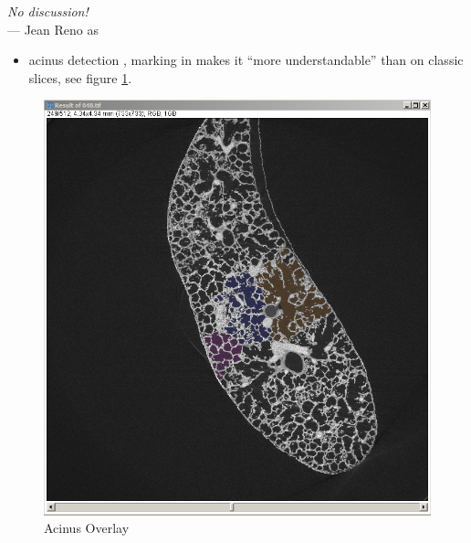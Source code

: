 \label{ch:discussion}
\begin{flushright}{\slshape No discussion!} \\ \medskip
    --- Jean Reno as \citep{Leon}
\end{flushright}
\bigskip
\begin{itemize}
	\item acinus detection \threed, marking in \twod makes it ``more understandable'' than on classic slices, see figure \ref{fig:acinus overlay}.
\end{itemize}
\vspace{52mm}

\renewcommand{\imsize}{0.618\linewidth}

\begin{figure}[h]
	\centering
	\includegraphics[width=\imsize]{img/Acinus_Overlay}
	\caption{Acinus Overlay}
	\label{fig:acinus overlay}
\end{figure}